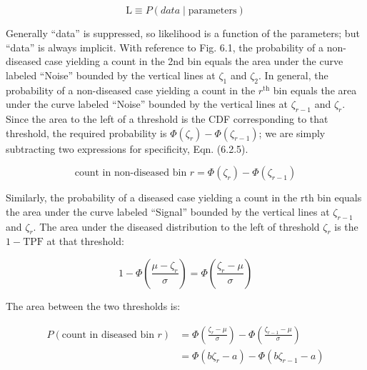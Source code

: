 \documentclass[
]{book}
\begin{document}
\begin{equation*} 
\text {L} \equiv P\left ( data \mid \text {parameters} \right )
\end{equation*}

Generally ``data'' is suppressed, so likelihood is a function of the parameters; but ``data'' is always implicit. With reference to Fig. 6.1, the probability of a non-diseased case yielding a count in the 2nd bin equals the area under the curve labeled ``Noise'' bounded by the vertical lines at \(\zeta_1\) and \(\zeta_2\). In general, the probability of a non-diseased case yielding a count in the \(r^\text{th}\) bin equals the area under the curve labeled ``Noise'' bounded by the vertical lines at \(\zeta_{r-1}\) and \(\zeta_r\). Since the area to the left of a threshold is the CDF corresponding to that threshold, the required probability is \(\Phi\left ( \zeta_r \right ) - \Phi\left ( \zeta_{r-1} \right )\); we are simply subtracting two expressions for specificity, Eqn. (6.2.5).

\begin{equation*} 
\text {count in non-diseased bin } r = \Phi\left ( \zeta_r \right ) - \Phi\left ( \zeta_{r-1} \right )
\end{equation*}

Similarly, the probability of a diseased case yielding a count in the rth bin equals the area under the curve labeled ``Signal'' bounded by the vertical lines at \(\zeta_{r-1}\) and \(\zeta_r\). The area under the diseased distribution to the left of threshold \(\zeta_r\) is the \(1 - \text{TPF}\) at that threshold:

\begin{equation*} 
1 - \Phi\left ( \frac{\mu-\zeta_r}{\sigma} \right ) = \Phi\left ( \frac{\zeta_r - \mu}{\sigma} \right )
\end{equation*}

The area between the two thresholds is:

\begin{align*} 
P\left ( \text{count in diseased bin }r \right ) &= \Phi\left ( \frac{\zeta_r - \mu}{\sigma} \right ) - \Phi\left ( \frac{\zeta_{r-1} - \mu}{\sigma} \right ) \\
&= \Phi\left ( b\zeta_r-a \right ) - \Phi\left ( b\zeta_{r-1}-a \right )
\end{align*}
\end{document}
